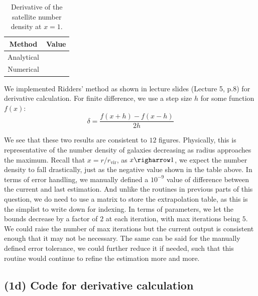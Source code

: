 \documentclass{article}
\begin{document}
    \begin{table}[H]
    \centering
      \begin{tabular}{|c|c|}
        \hline
        Method & Value \\
        \hline
        Analytical &  \\
        Numerical &  \\
        \hline
      \end{tabular}
      \caption{Derivative of the satellite number density at \(x=1\).}
    \end{table}

    We implemented Ridders' method as shown in lecture slides (Lecture 5, p.8) for 
    derivative calculation. For finite difference, we use a step size $h$ for some 
    function $f(x)$:
    \begin{equation}
      \delta = \frac{f(x+h)-f(x-h)}{2h}
    \end{equation}

    We see that these two results are consistent to $12$ figures. Physically, this is 
    representative of the number density of galaxies decreasing as radius approaches
    the maximum. Recall that $x= r/r_\text{vir}$, as $x \righarrow 1$, we expect the 
    number density to fall drastically, just as the negative value shown in the table 
    above. In terms of error handling, we manually defined a $10^{-9}$ value of
    difference between the current and last estimation. And unlike the routines in 
    previous parts of this question, we do need to use a matrix to store the 
    extrapolation table, as this is the simplist to write down for indexing. In terms of 
    parameters, we let the bounds decrease by a factor of $2$ at each iteration, with 
    max iterations being $5$. We could raise the number of max iterations but the 
    current output is consistent enough that it may not be necessary. The same can be
    said for the manually defined error tolerance, we could further reduce it if 
    needed, such that this routine would continue to refine the estimation more and 
    more.

  \subsection{(1d) Code for derivative calculation}
    
    \pagebreak
\end{document}
